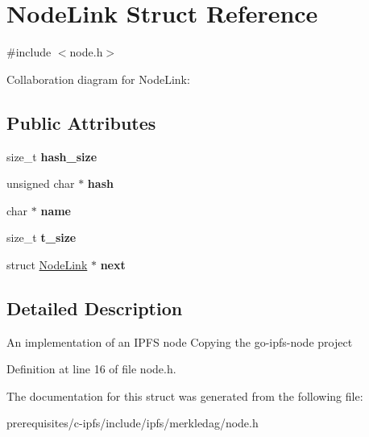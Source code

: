 \hypertarget{struct_node_link}{}\section{Node\+Link Struct Reference}
\label{struct_node_link}


{\ttfamily \#include $<$node.\+h$>$}



Collaboration diagram for Node\+Link\+:
\subsection*{Public Attributes}
\begin{DoxyCompactItemize}
\item 
\mbox{\label{struct_node_link_ad2cc376e6570fabccf1a838395fb42ab}} 
size\+\_\+t {\bfseries hash\+\_\+size}
\item 
\mbox{\label{struct_node_link_a860895a541bd7abe4eaff5e2b7ba1a39}} 
unsigned char $\ast$ {\bfseries hash}
\item 
\mbox{\label{struct_node_link_a870ce71cc8ed67079f82177e51d67088}} 
char $\ast$ {\bfseries name}
\item 
\mbox{\label{struct_node_link_a4057f3fadf72d93b751ad197e5a92c50}} 
size\+\_\+t {\bfseries t\+\_\+size}
\item 
\mbox{\label{struct_node_link_aab4fc792fed32c3de046bca22c7dc355}} 
struct \mbox{\hyperlink{struct_node_link}{Node\+Link}} $\ast$ {\bfseries next}
\end{DoxyCompactItemize}


\subsection{Detailed Description}
An implementation of an I\+P\+FS node Copying the go-\/ipfs-\/node project 

Definition at line 16 of file node.\+h.



The documentation for this struct was generated from the following file\+:\begin{DoxyCompactItemize}
\item 
prerequisites/c-\/ipfs/include/ipfs/merkledag/node.\+h\end{DoxyCompactItemize}
